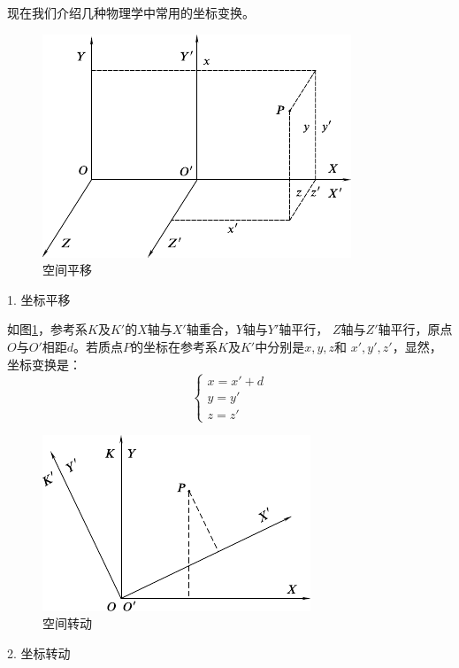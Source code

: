 现在我们介绍几种物理学中常用的坐标变换。

\begin{figure}
  \centering
  \includegraphics{figure/fig02.02}
  \caption{空间平移}
  \label{fig:02.02}
\end{figure}
\textsf{1. 坐标平移}

如图\ref{fig:02.02}，参考系$K$及$K'$的$X$轴与$X'$轴重合，$Y$轴与$Y'$轴平行，
$Z$轴与$Z'$轴平行，原点$O$与$O'$相距$d$。若质点$P$的坐标在参考系$K$及$K'$中分别是$x,y,z$和
$x',y',z'$，显然，坐标变换是：
\begin{equation}\label{eqn:02.02.03}
  \left\{\begin{array}{l}
    x=x'+d \\
    y=y'   \\
    z=z'
  \end{array}\right.
\end{equation}

\begin{figure}
  \centering
  \includegraphics{figure/fig02.03}
  \caption{空间转动}
  \label{fig:02.03}
\end{figure}
\textsf{2. 坐标转动}

